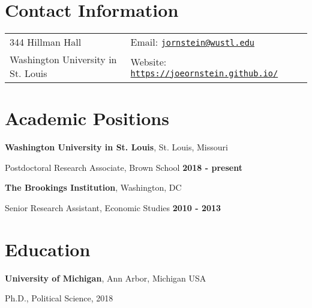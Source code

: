 \documentclass[margin,line]{res}
\newenvironment{list1}{
  \begin{list}{}{%
      \setlength{\itemsep}{0.1in}
      \setlength{\parsep}{0in} \setlength{\parskip}{0in}
      \setlength{\topsep}{0.1in} \setlength{\partopsep}{0in} 
      \setlength{\leftmargin}{0.17in}}}{\end{list}}
\newenvironment{list2}{
  \begin{list}{$\bullet$}{%
      \setlength{\itemsep}{0in}
      \setlength{\parsep}{0in} \setlength{\parskip}{0in}
      \setlength{\topsep}{0in} \setlength{\partopsep}{0in} 
      \setlength{\leftmargin}{0.2in}}}{\end{list}}
\begin{document}

\begin{resume}
	
\section{\sc Contact Information}
\vspace{.05in}
\begin{tabular}{@{}p{2.5in}p{4in}}   %
344 Hillman Hall & Email: \href{mailto:jornstein@wustl.edu}{\tt jornstein@wustl.edu}\\       
Washington University in St. Louis & Website: \href{https://joeornstein.github.io/}{\tt https://joeornstein.github.io/}\\
\end{tabular}


\section{\sc Academic Positions}
{\bf Washington University in St. Louis}, St. Louis, Missouri
\begin{list1}
	\item[] Postdoctoral Research Associate, Brown School \hfill {\bf 2018 - present}
\end{list1}

{\bf The Brookings Institution}, Washington, DC
\begin{list1}
	\item[] Senior Research Assistant, Economic Studies \hfill {\bf 2010 - 2013}
\end{list1}



\section{\sc Education}
{\bf University of Michigan}, Ann Arbor, Michigan USA
\begin{list1}
\item[] Ph.D., Political Science, 2018
\end{list1}


\end{resume}
\end{document}
